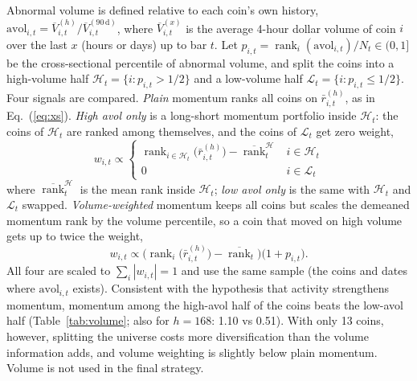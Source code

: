 \documentclass[aps,prl,onecolumn,superscriptaddress,nofootinbib]{revtex4-2}
\begin{document}
	Abnormal volume is defined relative to each coin's own history, $\mathrm{avol}_{i,t} = \overline{V}_{i,t}^{(h)} / \overline{V}_{i,t}^{(90\,\mathrm{d})}$, where $\overline{V}_{i,t}^{(x)}$ is the average 4-hour dollar volume of coin $i$ over the last $x$ (hours or days) up to bar $t$. Let $p_{i,t} = \operatorname{rank}_i(\mathrm{avol}_{i,t}) / N_t \in (0,1]$ be the cross-sectional percentile of abnormal volume, and split the coins into a high-volume half $\mathcal H_t = \{i : p_{i,t} > 1/2\}$ and a low-volume half $\mathcal L_t = \{i : p_{i,t} \le 1/2\}$. Four signals are compared. \emph{Plain} momentum ranks all coins on $\bar r^{(h)}_{i,t}$, as in Eq.~(\ref{eq:xs}). \emph{High avol only} is a long-short momentum portfolio inside $\mathcal H_t$: the coins of $\mathcal H_t$ are ranked among themselves, and the coins of $\mathcal L_t$ get zero weight,
	\begin{equation}
		w_{i,t} \propto
		\begin{cases}
			\operatorname{rank}_{i \in \mathcal H_t}\big(\bar r^{(h)}_{i,t}\big) - \overline{\operatorname{rank}}^{\mathcal H}_t & i \in \mathcal H_t \\
			0 & i \in \mathcal L_t
		\end{cases}
		\label{eq:volhigh}
	\end{equation}
	where $\overline{\operatorname{rank}}^{\mathcal H}_t$ is the mean rank inside $\mathcal H_t$; \emph{low avol only} is the same with $\mathcal H_t$ and $\mathcal L_t$ swapped. \emph{Volume-weighted} momentum keeps all coins but scales the demeaned momentum rank by the volume percentile, so a coin that moved on high volume gets up to twice the weight,
	\begin{equation}
		w_{i,t} \propto \Big( \operatorname{rank}_i\big(\bar r^{(h)}_{i,t}\big) - \overline{\operatorname{rank}}_t \Big) \big( 1 + p_{i,t} \big).
		\label{eq:volw}
	\end{equation}
	All four are scaled to $\sum_i |w_{i,t}| = 1$ and use the same sample (the coins and dates where $\mathrm{avol}_{i,t}$ exists). Consistent with the hypothesis that activity strengthens momentum, momentum among the high-avol half of the coins beats the low-avol half (Table~\ref{tab:volume}; also for $h = 168$: 1.10 vs 0.51). With only 13 coins, however, splitting the universe costs more diversification than the volume information adds, and volume weighting is slightly below plain momentum. Volume is not used in the final strategy.
	
\end{document}

